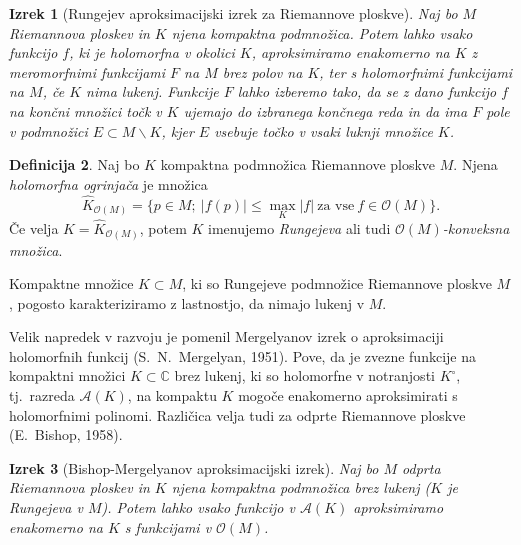 \documentclass[12pt,a4paper,twoside]{article}
\theoremstyle{definition} %
\newtheorem{definicija}{Definicija}[section]
\theoremstyle{plain} %
\newtheorem{izrek}[definicija]{Izrek}
\numberwithin{equation}{section}  %
\newcommand{\C}{\mathbb C}
\begin{document}
\begin{izrek}[Rungejev aproksimacijski izrek za Riemannove ploskve] \label{izr:Runge}
Naj bo $M$ Riemannova ploskev in $K$ njena kompaktna podmnožica. 
Potem lahko vsako funkcijo $f$, ki je holomorfna v okolici $K$, aproksimiramo enakomerno na $K$ z meromorfnimi funkcijami $F$ na $M$ brez polov na $K$, ter s holomorfnimi funkcijami na $M$, če $K$ nima lukenj.
Funkcije $F$ lahko izberemo tako, da se z dano funkcijo $f$ na končni množici točk v $K$ ujemajo do izbranega končnega reda in da ima $F$ pole v podmnožici $E \subset M \backslash K$, kjer $E$ vsebuje točko v vsaki luknji množice $K$. 
\end{izrek}

\begin{definicija}
Naj bo $K$ kompaktna podmnožica Riemannove ploskve $M$. Njena \emph{holomorfna ogrinjača} je množica 
\begin{equation}
\widehat{K}_{\mathcal{O}(M)} = \{p \in M ; \ |f(p)| \leq \max_{K} |f| \ \text{za vse} \ f \in \mathcal{O}(M) \}.
\end{equation}
Če velja $K = \widehat{K}_{\mathcal{O}(M)}$, potem $K$ imenujemo \emph{Rungejeva} ali tudi \emph{$\mathcal{O}(M)$-konveksna množica}.
\end{definicija}

Kompaktne množice $K \subset M$, ki so Rungejeve podmnožice Riemannove ploskve $M$, pogosto karakteriziramo z lastnostjo, da nimajo lukenj v $M$. \newline

Velik napredek v razvoju je pomenil Mergelyanov izrek o aproksimaciji holomorfnih funkcij (S.~N.~Mergelyan, 1951). Pove, da je zvezne funkcije na kompaktni množici $K \subset \C$ brez lukenj, ki so holomorfne v notranjosti $K^{\circ}$, tj.~razreda $\mathcal{A}(K)$, na kompaktu $K$ mogoče enakomerno aproksimirati s holomorfnimi polinomi.
Različica velja tudi za odprte Riemannove ploskve (E.~Bishop, 1958).

\begin{izrek} [Bishop-Mergelyanov aproksimacijski izrek] \label{izr:Bishop-Mergelyan}
Naj bo $M$ odprta Riemannova ploskev in $K$ njena kompaktna podmnožica brez lukenj ($K$ je Rungejeva v $M$). Potem lahko vsako funkcijo v $\mathcal{A}(K)$ aproksimiramo enakomerno na $K$ s funkcijami v $\mathcal{O}(M)$.
\end{izrek}
\end{document}
